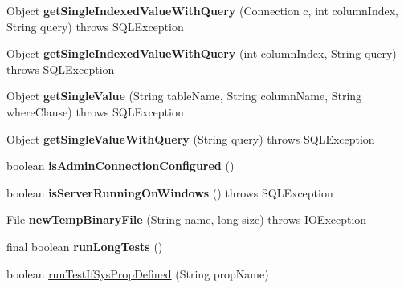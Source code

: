 \begin{DoxyCompactItemize}
Object {\bfseries get\+Single\+Indexed\+Value\+With\+Query} (Connection c, int column\+Index, String query)  throws S\+Q\+L\+Exception 
\item 
\mbox{\label{classtestsuite_1_1_base_test_case_a863b877857af0632dbdfb73b3cc0dfcc}} 
Object {\bfseries get\+Single\+Indexed\+Value\+With\+Query} (int column\+Index, String query)  throws S\+Q\+L\+Exception 
\item 
\mbox{\label{classtestsuite_1_1_base_test_case_acd63545de5bb38d1a442c2a09d3bddc4}} 
Object {\bfseries get\+Single\+Value} (String table\+Name, String column\+Name, String where\+Clause)  throws S\+Q\+L\+Exception 
\item 
\mbox{\label{classtestsuite_1_1_base_test_case_a64b5c6d2782cd2ac6f359edf9b5c7365}} 
Object {\bfseries get\+Single\+Value\+With\+Query} (String query)  throws S\+Q\+L\+Exception 
\item 
\mbox{\label{classtestsuite_1_1_base_test_case_a0c430c33af3faad8e9490abda2054142}} 
boolean {\bfseries is\+Admin\+Connection\+Configured} ()
\item 
\mbox{\label{classtestsuite_1_1_base_test_case_a38e227a349a04887dd5fdff34c746389}} 
boolean {\bfseries is\+Server\+Running\+On\+Windows} ()  throws S\+Q\+L\+Exception 
\item 
\mbox{\label{classtestsuite_1_1_base_test_case_a2fb4c1ccc05d5db9f33abb34e9c2a9a7}} 
File {\bfseries new\+Temp\+Binary\+File} (String name, long size)  throws I\+O\+Exception 
\item 
\mbox{\label{classtestsuite_1_1_base_test_case_ae5d273da4f580cf9778ec0c7c7072fad}} 
final boolean {\bfseries run\+Long\+Tests} ()
\item 
boolean \mbox{\hyperlink{classtestsuite_1_1_base_test_case_a3578b222700fc502212ce9834194ebaa}{run\+Test\+If\+Sys\+Prop\+Defined}} (String prop\+Name)
\item 
\mbox{\label{classtestsuite_1_1_base_test_case_a145dcd536d811f0f904c1d711cf275f7}} 

\end{DoxyCompactItemize}
